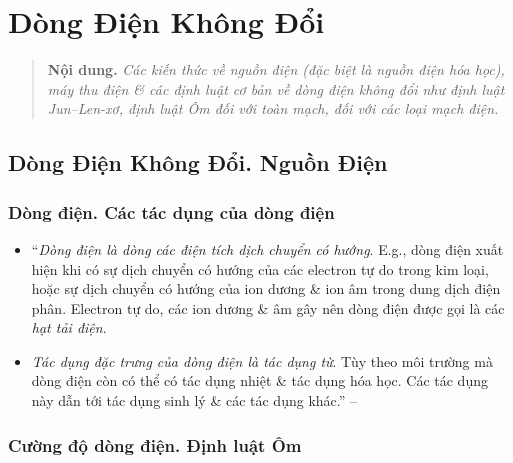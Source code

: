 \documentclass[oneside]{book}
\numberwithin{equation}{section}
\begin{document}

\chapter{Dòng Điện Không Đổi}

\begin{quotation}
	\textbf{Nội dung.} \textit{Các kiến thức về nguồn điện (đặc biệt là nguồn điện hóa học), máy thu điện \& các định luật cơ bản về dòng điện không đổi như định luật Jun--Len-xơ, định luật Ôm đối với toàn mạch, đối với các loại mạch điện.}
\end{quotation}

\section{Dòng Điện Không Đổi. Nguồn Điện}

\subsection{Dòng điện. Các tác dụng của dòng điện}
\begin{itemize}
	\item ``\textit{Dòng điện là dòng các điện tích dịch chuyển có hướng}. E.g., dòng điện xuất hiện khi có sự dịch chuyển có hướng của các electron tự do trong kim loại, hoặc sự dịch chuyển có hướng của ion dương \& ion âm trong dung dịch điện phân. Electron tự do, các ion dương \& âm gây nên dòng điện được gọi là các \textit{hạt tải điện}.
	\item \textit{Tác dụng đặc trưng của dòng điện là tác dụng từ}. Tùy theo môi trường mà dòng điện còn có thể có tác dụng nhiệt \& tác dụng hóa học. Các tác dụng này dẫn tới tác dụng sinh lý \& các tác dụng khác.'' -- \cite[p. 48]{SGK_Vat_Ly_11_nang_cao}
\end{itemize}

\subsection{Cường độ dòng điện. Định luật Ôm}
\end{document}
